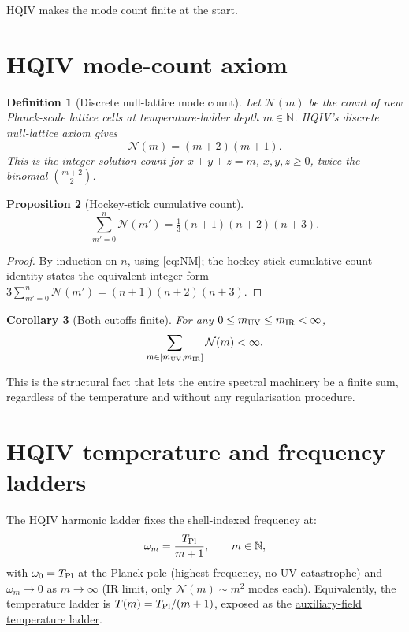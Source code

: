 \documentclass[11pt]{amsart}
\newtheorem{definition}{Definition}[section]
\newtheorem{proposition}[definition]{Proposition}
\newtheorem{corollary}[definition]{Corollary}
\begin{document}
HQIV makes the mode count finite at the start.

\section{HQIV mode-count axiom}\label{sec:axiom}

\begin{definition}[Discrete null-lattice mode count]\label{def:simplex}
Let $\mathcal{N}(m)$ be the count of new Planck-scale lattice
cells at temperature-ladder depth $m\in\mathbb{N}$.  HQIV's
discrete null-lattice axiom gives
\begin{equation}\label{eq:NM}
  \mathcal{N}(m)=(m+2)(m+1).
\end{equation}
This is the integer-solution count for $x+y+z=m$, $x,y,z\ge 0$,
twice the binomial $\binom{m+2}{2}$.
\end{definition}

\begin{proposition}[Hockey-stick cumulative count]\label{prop:cum}
\begin{equation}\label{eq:cum}
  \sum_{m'=0}^{n}\mathcal{N}(m')
   =\tfrac{1}{3}(n+1)(n+2)(n+3).
\end{equation}
\end{proposition}
\begin{proof}
By induction on $n$, using \eqref{eq:NM}; the
\hyperref[lean:hockey-stick]{hockey-stick cumulative-count
identity} states the equivalent integer form
$3\sum_{m'=0}^{n}\mathcal{N}(m')=(n+1)(n+2)(n+3)$.
\end{proof}

\begin{corollary}[Both cutoffs finite]\label{cor:finite}
For any $0\le m_{\rm UV}\le m_{\rm IR}<\infty$,
\[
  \sum_{m\in[m_{\rm UV},m_{\rm IR}]}\mathcal{N}(m)<\infty.
\]
\end{corollary}

This is the structural fact that lets the entire spectral
machinery be a finite sum, regardless of the temperature and
without any regularisation procedure.

\section{HQIV temperature and frequency ladders}\label{sec:ladder}

The HQIV harmonic ladder fixes the shell-indexed frequency at:
\begin{equation}\label{eq:freq}
  \omega_m=\frac{T_{\rm Pl}}{m+1},\qquad m\in\mathbb{N},
\end{equation}
with $\omega_{0}=T_{\rm Pl}$ at the Planck pole (highest
frequency, no UV catastrophe) and $\omega_m\to 0$ as
$m\to\infty$ (IR limit, only $\mathcal{N}(m)\sim m^{2}$ modes
each).  Equivalently, the temperature ladder is
$T(m)=T_{\rm Pl}/(m+1)$, exposed as the
\hyperref[lean:auxiliary-T]{auxiliary-field temperature ladder}.
\end{document}
